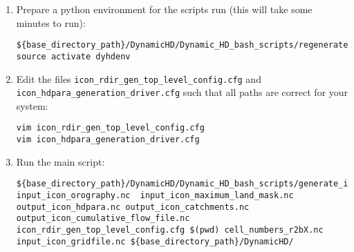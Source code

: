 \documentclass{article}
\begin{document}
\begin{enumerate}
\begin{lstlisting}[style=bash_input,breaklines=true]
cd hdpara_gen_workdir 
scp username@login1.mpimet.mpg.de:/home/mpim/m300468/mk_ic_rdirs/cell_numbers_r2bX.nc $(pwd)
scp username@login1.mpimet.mpg.de:/home/mpim/m300468/mk_ic_rdirs/icon_rdir_gen_top_level_config.cfg $(pwd)
scp username@login1.mpimet.mpg.de:/home/mpim/m300468/mk_ic_rdirs/icon_hdpara_generation_driver.cfg $(pwd)
scp username@login1.mpimet.mpg.de:/home/mpim/m300468/mk_ic_rdirs/corrected_orog_intermediary_ICE5G_and_tarasov_upscaled_srtm30plus_north_america_only_data_ALG4_sinkless_glcc_olson_lsmask_0k_20170517_003802.nc $(pwd)
scp username@login1.mpimet.mpg.de:/home/mpim/m300468/mk_ic_rdirs/rdirs_hydrosheds_au_af_sa_upscaled_10min_20200203_163646.nc $(pwd) 
\end{lstlisting}
Note the file \lstinline[style=bash_input]{corrected_orog_intermediary_ICE5G_and_tarasov_upscaled_srtm30plus_north_america_only_data_ALG4_sinkless_glcc_olson_lsmask_0k_20170517_003802.nc} currently lacks grid information. The script has been configured to read this file in the correct orientation. It may require modification if another corrected orography is substituted for this file.
\item Prepare a python environment for the scripts run (this will take some minutes to run):
\begin{lstlisting}[style=bash_input,breaklines=true]
${base_directory_path}/DynamicHD/Dynamic_HD_bash_scripts/regenerate_conda_environment.sh 
source activate dyhdenv
\end{lstlisting}
\item Edit the files \lstinline[style=bash_input]{icon_rdir_gen_top_level_config.cfg} and \lstinline[style=bash_input]{icon_hdpara_generation_driver.cfg} such that all paths are correct for your system:

\begin{lstlisting}[style=bash_input,breaklines=true]
vim icon_rdir_gen_top_level_config.cfg
vim icon_hdpara_generation_driver.cfg 
\end{lstlisting}

\item Run the main script:
\begin{lstlisting}[style=bash_input,breaklines=true]
${base_directory_path}/DynamicHD/Dynamic_HD_bash_scripts/generate_icon_hdpara_top_level_driver.sh input_icon_orography.nc  input_icon_maximum_land_mask.nc  output_icon_hdpara.nc output_icon_catchments.nc output_icon_cumulative_flow_file.nc icon_rdir_gen_top_level_config.cfg $(pwd) cell_numbers_r2bX.nc input_icon_gridfile.nc ${base_directory_path}/DynamicHD/
\end{lstlisting}
\end{enumerate}
\end{document}

